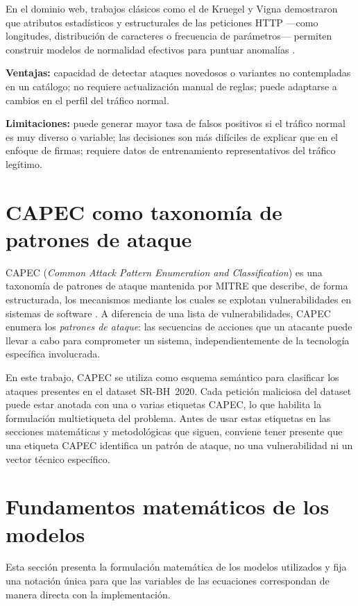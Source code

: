 \documentclass[12pt,oneside]{report}
\begin{document}
En el dominio web, trabajos clásicos como el de Kruegel y Vigna demostraron que atributos estadísticos y estructurales de las peticiones HTTP —como longitudes, distribución de caracteres o frecuencia de parámetros— permiten construir modelos de normalidad efectivos para puntuar anomalías \cite{kruegel_vigna_2003}.

\textbf{Ventajas:} capacidad de detectar ataques novedosos o variantes no contempladas en un catálogo; no requiere actualización manual de reglas; puede adaptarse a cambios en el perfil del tráfico normal.

\textbf{Limitaciones:} puede generar mayor tasa de falsos positivos si el tráfico normal es muy diverso o variable; las decisiones son más difíciles de explicar que en el enfoque de firmas; requiere datos de entrenamiento representativos del tráfico legítimo.

\section{CAPEC como taxonomía de patrones de ataque}

CAPEC (\textit{Common Attack Pattern Enumeration and Classification}) es una taxonomía de patrones de ataque mantenida por MITRE que describe, de forma estructurada, los mecanismos mediante los cuales se explotan vulnerabilidades en sistemas de software \cite{capec_home,capec_about}. A diferencia de una lista de vulnerabilidades, CAPEC enumera los \textit{patrones de ataque}: las secuencias de acciones que un atacante puede llevar a cabo para comprometer un sistema, independientemente de la tecnología específica involucrada.

En este trabajo, CAPEC se utiliza como esquema semántico para clasificar los ataques presentes en el dataset SR-BH~2020. Cada petición maliciosa del dataset puede estar anotada con una o varias etiquetas CAPEC, lo que habilita la formulación multietiqueta del problema. Antes de usar estas etiquetas en las secciones matemáticas y metodológicas que siguen, conviene tener presente que una etiqueta CAPEC identifica un patrón de ataque, no una vulnerabilidad ni un vector técnico específico.

\section{Fundamentos matemáticos de los modelos}

Esta sección presenta la formulación matemática de los modelos utilizados y fija una notación única
para que las variables de las ecuaciones correspondan de manera directa con la implementación.
\end{document}
